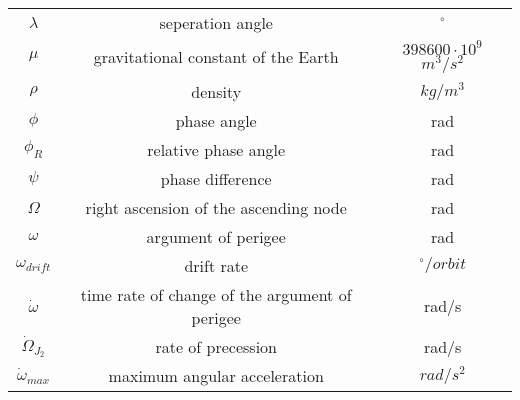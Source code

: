 \begin{center}
\begin{longtable}{c|c|c}
$\lambda$ 													& seperation angle																												& $^\circ$ \\ 

$\mu$														 		& gravitational constant of the Earth 																		& $398600\cdot 10^9$ $m^3/s^2$ \\

$\rho$ 															& density 																																& $kg/m^3$ \\

$\phi$ 															& phase angle 																														& rad \\
	
$\phi _R$														& relative phase angle 																										& rad \\

$\psi$															& phase difference																												& rad \\
     
$\Omega$ 														& right ascension of the ascending node 																	& rad \\

$\omega$ 														& argument of perigee																											& rad \\

$\omega_{drift}$                    & drift rate                                  														& $^\circ/orbit$ \\

$\dot \omega$ 											& time rate of change of the argument of perigee 													& rad/s \\

$\dot \Omega _{J_2 }$ 							& rate of precession 																											& rad/s \\

$\dot \omega_{max}$                 & maximum angular acceleration                														& $rad/s^2$ \\ 
 
\end{longtable}
\end{center}